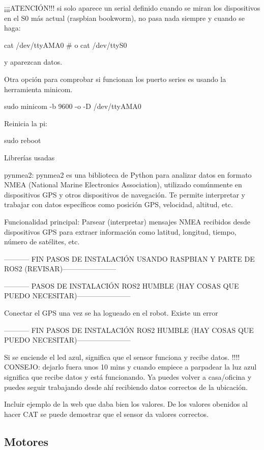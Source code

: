 ¡¡¡ATENCIÓN!!! si solo aparece un serial definido cuando se miran los dispositivos en el S0 más actual (raspbian bookworm), no pasa nada siempre y cuando se haga:

cat /dev/ttyAMA0 \# o cat /dev/ttyS0

y aparezcan datos.

Otra opción para comprobar si funcionan los puerto series es usando la herramienta minicom.

sudo minicom -b 9600 -o -D /dev/ttyAMA0

Reinicia la pi:

sudo reboot

Librerías usadas

pynmea2: pynmea2 es una biblioteca de Python para analizar datos en formato NMEA (National Marine Electronics Association), utilizado comúnmente en dispositivos GPS y otros dispositivos de navegación. Te permite interpretar y trabajar con datos específicos como posición GPS, velocidad, altitud, etc.

Funcionalidad principal: Parsear (interpretar) mensajes NMEA recibidos desde dispositivos GPS para extraer información como latitud, longitud, tiempo, número de satélites, etc.

----------- FIN PASOS DE INSTALACIÓN USANDO RASPBIAN Y PARTE DE ROS2 (REVISAR)-----------------------


----------- PASOS DE INSTALACIÓN ROS2 HUMBLE (HAY COSAS QUE PUEDO NECESITAR)-----------------------


Conectar el GPS una vez se ha logueado en el robot. Existe un error
 
----------- FIN PASOS DE INSTALACIÓN ROS2 HUMBLE (HAY COSAS QUE PUEDO NECESITAR)-----------------------


Si se enciende el led azul, significa que el sensor funciona y recibe datos. !!!!  CONSEJO: dejarlo fuera unos 10 mins y cuando empiece a parpadear la luz azul significa que recibe datos y está funcionando. Ya puedes volver a casa/oficina y puedes seguir trabajando desde ahí recibiendo datos correctos de la ubicación. 

Incluir ejemplo de la web que daba bien los valores. De los valores obenidos al hacer CAT se puede demostrar que el sensor da valores correctos. 



\subsection{Motores}
\label{subsec:configmotores}

